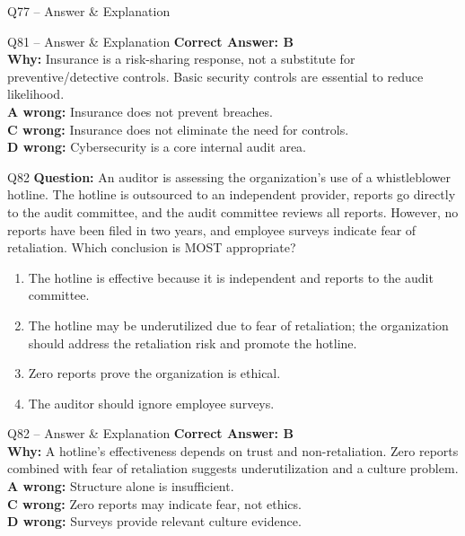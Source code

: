 \documentclass[aspectratio=169,10pt]{beamer}
\begin{document}
\begin{frame}[t]{Q77 -- Answer \& Explanation}
	\begin{frame}[t]{Q81 -- Answer \& Explanation}
		\small
		\textbf{Correct Answer: B} \\[4pt]
		\textbf{Why:} Insurance is a risk-sharing response, not a substitute for preventive/detective controls. Basic security controls are essential to reduce likelihood. \\[4pt]
		\textbf{A wrong:} Insurance does not prevent breaches. \\[2pt]
		\textbf{C wrong:} Insurance does not eliminate the need for controls. \\[2pt]
		\textbf{D wrong:} Cybersecurity is a core internal audit area.
	\end{frame}
	
	\begin{frame}[t]{Q82}
		\small
		\textbf{Question:} An auditor is assessing the organization's use of a whistleblower hotline. The hotline is outsourced to an independent provider, reports go directly to the audit committee, and the audit committee reviews all reports. However, no reports have been filed in two years, and employee surveys indicate fear of retaliation. Which conclusion is MOST appropriate?
		\begin{enumerate}[label=\Alph*.,itemsep=1pt,topsep=2pt]
			\item The hotline is effective because it is independent and reports to the audit committee.
			\item The hotline may be underutilized due to fear of retaliation; the organization should address the retaliation risk and promote the hotline.
			\item Zero reports prove the organization is ethical.
			\item The auditor should ignore employee surveys.
		\end{enumerate}
	\end{frame}
	
	\begin{frame}[t]{Q82 -- Answer \& Explanation}
		\small
		\textbf{Correct Answer: B} \\[4pt]
		\textbf{Why:} A hotline's effectiveness depends on trust and non-retaliation. Zero reports combined with fear of retaliation suggests underutilization and a culture problem. \\[4pt]
		\textbf{A wrong:} Structure alone is insufficient. \\[2pt]
		\textbf{C wrong:} Zero reports may indicate fear, not ethics. \\[2pt]
		\textbf{D wrong:} Surveys provide relevant culture evidence.
	\end{frame}
	

\end{frame}
\end{document}
